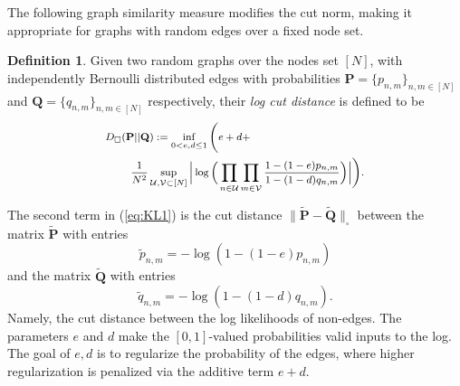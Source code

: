 \documentclass{article}
\theoremstyle{plain}
\theoremstyle{definition}
\newtheorem{definition}[theorem]{Definition}
\theoremstyle{remark}
\begin{document}
The following graph similarity measure modifies the cut norm, making it appropriate for graphs with random edges over a fixed node set.
\begin{definition}
\label{def:KL1}
Given two random graphs over the nodes set $[N]$, with independently Bernoulli distributed edges with probabilities $\mathbf{P}=\{p_{n,m}\}_{n,m\in[N]}$ and $\mathbf{Q}=\{q_{n,m}\}_{n,m\in[N]}$ respectively, their \emph{log cut distance} is defined to be 
\begin{equation}
\footnotesize
    \begin{split}
       & D_{\square}(\mathbf{P} || \mathbf{Q}):=  \inf_{0< e,d\leq 1} \Bigg( e+d+ \\
       &  \quad \quad \  \frac{1}{N^2}\sup_{\mathcal{U},\mathcal{V}\subset[N]}\Big|\log\Big(\prod_{n\in \mathcal{U}}\prod_{m\in \mathcal{V}}
\frac{1-(1-e)p_{n,m}}{1-(1-d)q_{n,m}}\Big)\Big|\Bigg).
    \end{split}
    \label{eq:KL1}
\end{equation}
\end{definition}
The second term in (\ref{eq:KL1}) is the cut distance $\| \tilde{\mathbf{P}}-\tilde{\mathbf{Q}}\|_{\square}$ between the matrix $\tilde{\mathbf{P}}$ with entries 
\[\tilde{p}_{n,m}=-\log(1-(1-e)p_{n,m})\]
and the matrix $\tilde{\mathbf{Q}}$
 with entries 
 \[\tilde{q}_{n,m}=-\log(1-(1-d)q_{n,m}).\] Namely, the cut distance between the log likelihoods of non-edges. The parameters $e$ and $d$ make the $[0,1]$-valued probabilities valid inputs to the log. The goal of $e,d$ is to regularize the probability of the edges, where higher regularization is penalized via the additive term $e+d$. %
\end{document}
